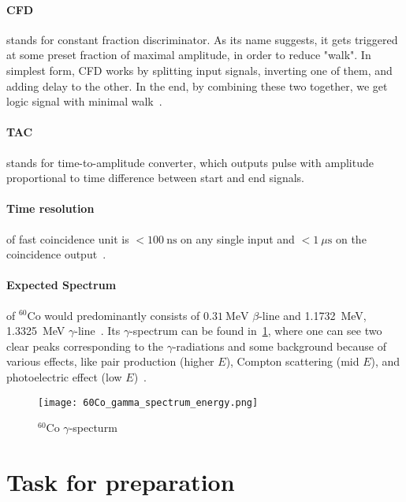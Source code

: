 
\paragraph{CFD} stands for constant fraction discriminator. As its name suggests, it gets triggered at some preset fraction of maximal amplitude, in order to reduce "walk". In simplest form, CFD works by splitting input signals, inverting one of them, and adding delay to the other. In the end, by combining these two together, we get logic signal with minimal walk~\cite{CFDmanual}.


\paragraph{TAC} stands for time-to-amplitude converter, which outputs pulse with amplitude proportional to time difference between start and end signals.

\paragraph{Time resolution} of fast coincidence unit is $< \SI{100}{\nano\s}$ on any single input and $< \SI{1}{\mu\s}$ on the coincidence output~\cite{fastmanual}.

\paragraph{Expected Spectrum} of ${}^{60} \text{Co}$ would predominantly consists of $\SI{0.31}{\mega\eV}$ $\beta$-line and \SI{1.1732}{\mega\eV}, \SI{1.3325}{\mega\eV} $\gamma$-line~\cite{firestone}. Its $\gamma$-spectrum can be found in~\ref{fig:CoSpec}, where one can see two clear peaks corresponding to the $\gamma$-radiations and some background because of various effects, like pair production (higher $E$), Compton scattering (mid $E$), and photoelectric effect (low $E$)~\cite{wermes}.

\begin{figure}[ht]
   \centering
   \texttt{[image: 60Co\_gamma\_spectrum\_energy.png]}
   \caption{${}^{60}\text{Co}$ $\gamma$-specturm~\cite{CoSpec}}%
   \label{fig:CoSpec}
\end{figure}

\section{Task for preparation}
